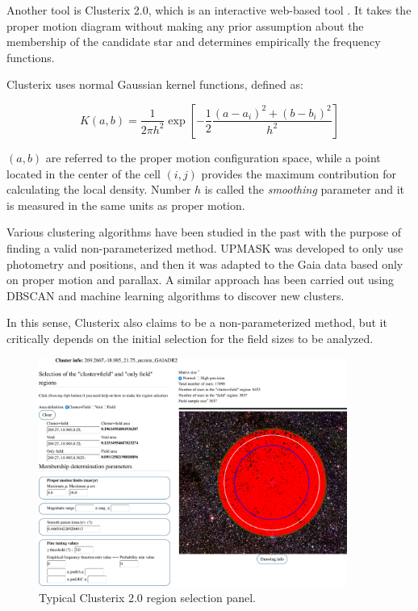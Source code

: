 \documentclass[11pt, a4paper, english]{book}
\begin{document}
Another tool is Clusterix 2.0, which is an interactive web-based tool \cite{balaguer2020clusterix}.
It takes the proper motion diagram without making any prior assumption about the membership of the candidate star
and determines empirically the frequency functions.

Clusterix uses normal Gaussian kernel functions, defined as:

\begin{equation}
  K(a, b) = \frac{1}{2 \pi h^{2}} \exp{ \left[ - \frac{1}{2}\frac{\left( a - a_{i} \right)^{2} + \left( b - b_{i} \right)^{2}}{ h^{2}} \right]}
\end{equation}

$\left( a, b \right)$ are referred to the proper motion configuration space,
while a point located in the center of the cell $\left( i, j \right)$ provides the maximum
contribution for calculating the local density.
Number $h$ is called the \emph{smoothing} parameter and it is measured in the same units as proper motion.

Various clustering algorithms have been studied in the past with the purpose of finding a valid non-parameterized method.
UPMASK \cite{krone2014upmask} was developed to only use photometry and positions,
and then it was adapted to the Gaia data \cite{cantat2018gaia} based only on proper motion and parallax.
A similar approach has been carried out using DBSCAN and machine learning algorithms to discover new clusters.

In this sense, Clusterix also claims to be a non-parameterized method,
but it critically depends on the initial selection for the field sizes to be analyzed.

\begin{figure}[htbp]
  \centering
  \includegraphics[width=0.9\textwidth]{../figures/clusterix/selection.pdf}
  \caption{Typical Clusterix 2.0 region selection panel.}
  \label{fig:clusterix_control_panel}
\end{figure}
\end{document}
